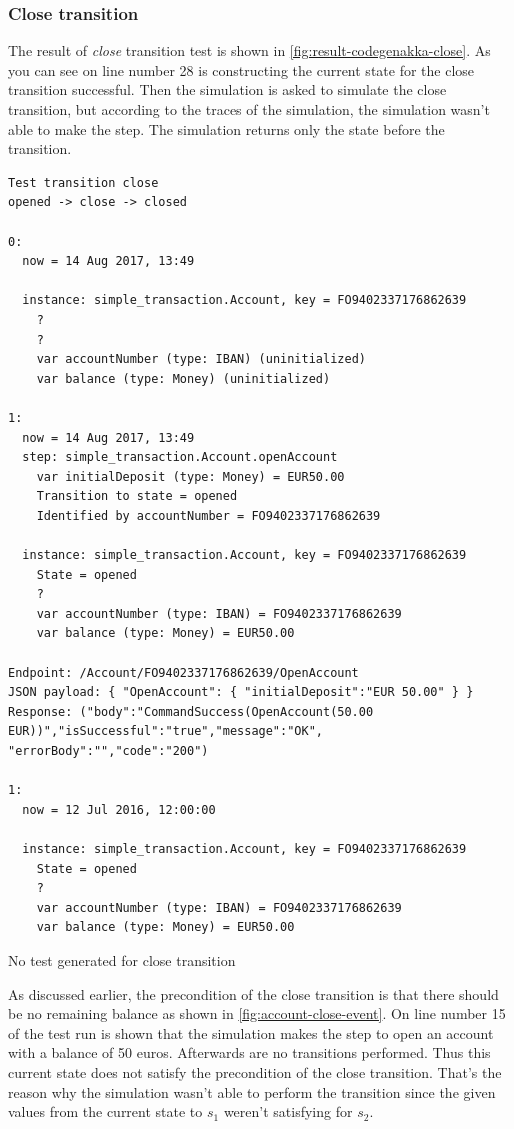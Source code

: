 \subsubsection{Close transition}\label{sec:close-no-test-codegenakka}

The result of \textit{close} transition test is shown in
\autoref{fig:result-codegenakka-close}. As you can see on line number 28 is
constructing the current state for the close transition successful. Then the
simulation is asked to simulate the close transition, but according to the
traces of the simulation, the simulation wasn't able to make the step. The
simulation returns only the state before the transition.

\begin{sourcecode}[h!]
\begin{lstlisting}[]
Test transition close
opened -> close -> closed

0:
  now = 14 Aug 2017, 13:49

  instance: simple_transaction.Account, key = FO9402337176862639
    ?
    ?
    var accountNumber (type: IBAN) (uninitialized)
    var balance (type: Money) (uninitialized)

1:
  now = 14 Aug 2017, 13:49
  step: simple_transaction.Account.openAccount
    var initialDeposit (type: Money) = EUR50.00
    Transition to state = opened
    Identified by accountNumber = FO9402337176862639

  instance: simple_transaction.Account, key = FO9402337176862639
    State = opened
    ?
    var accountNumber (type: IBAN) = FO9402337176862639
    var balance (type: Money) = EUR50.00

Endpoint: /Account/FO9402337176862639/OpenAccount
JSON payload: { "OpenAccount": { "initialDeposit":"EUR 50.00" } }
Response: ("body":"CommandSuccess(OpenAccount(50.00 EUR))","isSuccessful":"true","message":"OK",
"errorBody":"","code":"200")

1:
  now = 12 Jul 2016, 12:00:00

  instance: simple_transaction.Account, key = FO9402337176862639
    State = opened
    ?
    var accountNumber (type: IBAN) = FO9402337176862639
    var balance (type: Money) = EUR50.00
\end{lstlisting}
\caption{No test generated for close transition}\label{fig:result-codegenakka-close}
\end{sourcecode}
\FloatBarrier

As discussed earlier, the precondition of the close transition is that there
should be no remaining balance as shown in \autoref{fig:account-close-event}.
On line number 15 of the test run is shown that the simulation makes the step to
open an account with a balance of 50 euros. Afterwards are no transitions
performed. Thus this current state does not satisfy the precondition of the
close transition. That's the reason why the simulation wasn't able to perform the
transition since the given values from the current state to $s_{1}$ weren't
satisfying for $s_{2}$.

